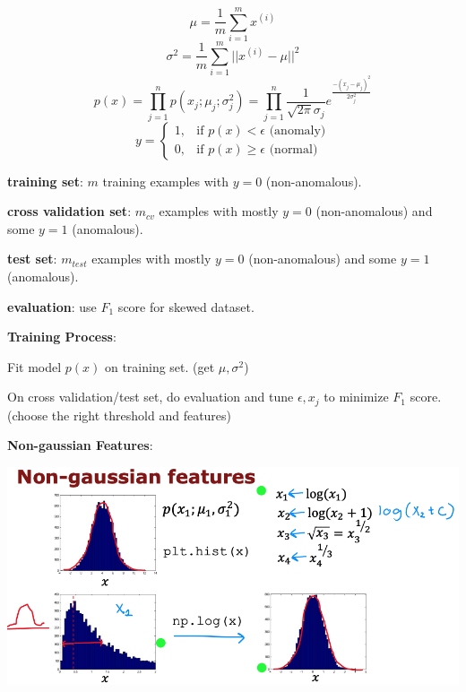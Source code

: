 \documentclass{article}
\begin{document}
\[\mu = \frac{1}{m} \sum_{i = 1}^{m} x^{(i)}\]
\[\sigma^2 = \frac{1}{m} \sum_{i = 1}^{m} \vert\vert x^{(i)} - \mu \vert\vert^2\]
\[p(x) = \prod_{j = 1}^{n} p(x_{j}; \mu_{j}; \sigma_{j}^2) = \prod_{j = 1}^{n} \frac{1}{\sqrt{2\pi}\sigma_{j}} e^{\frac{-(x_{j} - \mu_{j})^2}{2\sigma_{j}^2}}\]
\[
y =
\begin{cases}
  1, & \text{if } p(x) < \epsilon \text{ (anomaly)} \\
  0, & \text{if } p(x) \geq \epsilon \text{ (normal)}
\end{cases}
\]

\bigskip

\noindent \textbf{training set}: \(m\) training examples with \(y = 0\) (non-anomalous).

\bigskip

\noindent \textbf{cross validation set}: \(m_{cv}\) examples with mostly \(y = 0\) (non-anomalous) and some \(y = 1\) (anomalous).

\bigskip

\noindent \textbf{test set}: \(m_{test}\) examples with mostly \(y = 0\) (non-anomalous) and some \(y = 1\) (anomalous).

\bigskip

\noindent \textbf{evaluation}: use \(F_1\) score for skewed dataset.

\bigskip

\noindent \textbf{Training Process}:

\noindent Fit model \(p(x)\) on training set. (get \(\mu, \sigma^2\))

\noindent On cross validation/test set, do evaluation and tune \(\epsilon, x_{j}\) to minimize \(F_1\) score. (choose the right threshold and features)

\bigskip

\noindent \textbf{Non-gaussian Features}:

\begin{center}
\includegraphics[scale=0.3]{./images/anomaly_detection_features.png}
\end{center}
\end{document}
